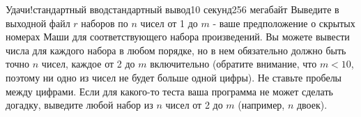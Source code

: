 \begin{problem}{Удачи!}{стандартный ввод}{стандартный вывод}{10 секунд}{256 мегабайт}
\OutputFile
Выведите в выходной файл $r$ наборов по $n$ чисел от 1 до $m$ - ваше предположение о скрытых номерах Маши для соответствующего набора произведений. Вы можете вывести числа для каждого набора в любом порядке, но в нем обязательно должно быть точно $n$ чисел, каждое от 2 до $m$ включительно (обратите внимание, что $m < 10$, поэтому ни одно из чисел не будет больше одной цифры). Не ставьте пробелы между цифрами. Если для какого-то теста ваша программа не может сделать догадку, выведите любой набор из $n$ чисел от 2 до $m$ (например, $n$ двоек).


\Examples

\begin{example}
%
\end{example}

\end{problem}
